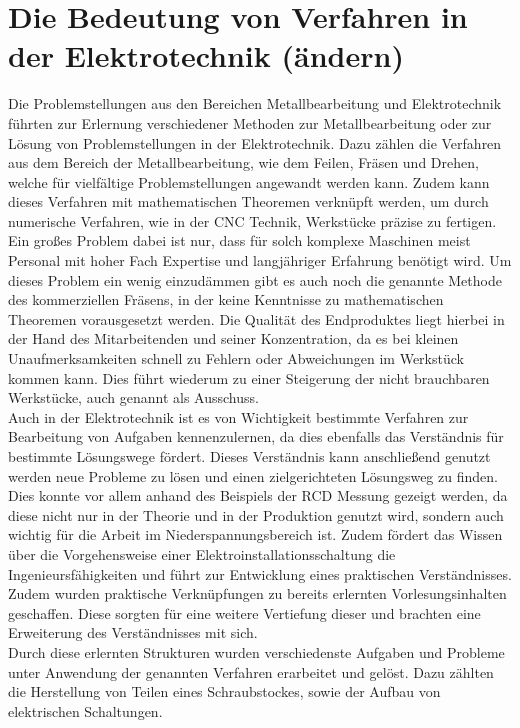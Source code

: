 \section{Die Bedeutung von Verfahren in der Elektrotechnik (ändern)}

Die Problemstellungen aus den Bereichen Metallbearbeitung und Elektrotechnik führten zur Erlernung verschiedener Methoden zur Metallbearbeitung oder zur 
Lösung von Problemstellungen in der Elektrotechnik. Dazu zählen die Verfahren aus dem Bereich der Metallbearbeitung, wie \zB dem Feilen, Fräsen und Drehen, 
welche für vielfältige Problemstellungen angewandt werden kann. Zudem kann dieses Verfahren mit mathematischen Theoremen verknüpft werden, um \zB durch 
numerische Verfahren, wie in der CNC Technik, Werkstücke präzise zu fertigen. Ein großes Problem dabei ist nur, dass für solch komplexe Maschinen meist 
Personal mit hoher Fach Expertise und langjähriger Erfahrung benötigt wird. Um dieses Problem ein wenig einzudämmen gibt es auch noch die genannte Methode 
des kommerziellen Fräsens, in der keine Kenntnisse zu mathematischen Theoremen vorausgesetzt werden. Die Qualität des Endproduktes liegt hierbei in der 
Hand des Mitarbeitenden und seiner Konzentration, da es bei kleinen Unaufmerksamkeiten schnell zu Fehlern oder Abweichungen im Werkstück kommen kann. Dies 
führt wiederum zu einer Steigerung der nicht brauchbaren Werkstücke, auch genannt als Ausschuss.
\\
Auch in der Elektrotechnik ist es von Wichtigkeit bestimmte Verfahren zur Bearbeitung von Aufgaben kennenzulernen, da dies ebenfalls das Verständnis für 
bestimmte Lösungswege fördert. Dieses Verständnis kann anschließend genutzt werden neue Probleme zu lösen und einen zielgerichteten Lösungsweg zu finden. 
Dies konnte vor allem anhand des Beispiels der RCD Messung gezeigt werden, da diese nicht nur in der Theorie und in der Produktion genutzt wird, sondern 
auch wichtig für die Arbeit im Niederspannungsbereich ist. Zudem fördert das Wissen über die Vorgehensweise einer Elektroinstallationsschaltung die 
Ingenieursfähigkeiten und führt zur Entwicklung eines praktischen Verständnisses. Zudem wurden praktische Verknüpfungen zu bereits erlernten 
Vorlesungsinhalten geschaffen. Diese sorgten für eine weitere Vertiefung dieser und brachten eine Erweiterung des Verständnisses mit sich.
\\
Durch diese erlernten Strukturen wurden verschiedenste Aufgaben und Probleme unter Anwendung der genannten Verfahren erarbeitet und gelöst. Dazu 
zählten \zB die Herstellung von Teilen eines Schraubstockes, sowie der Aufbau von elektrischen Schaltungen.


\clearpage
